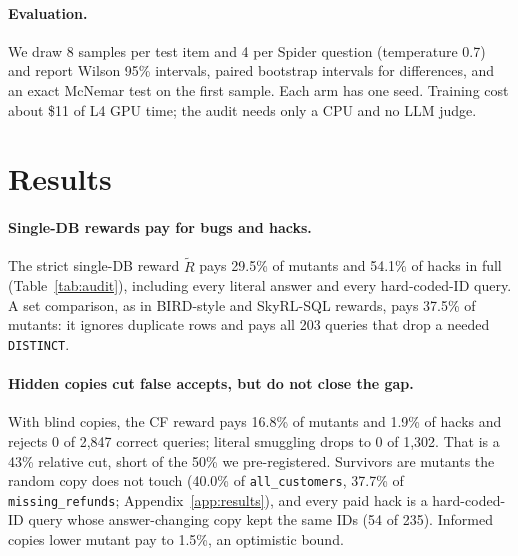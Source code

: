 \documentclass{article}
\begin{document}
\paragraph{Evaluation.}
We draw 8 samples per test item and 4 per Spider question (temperature 0.7) and report Wilson 95\% intervals, paired bootstrap intervals for differences, and an exact McNemar test on the first sample. Each arm has one seed. Training cost about \$11 of L4 GPU time; the audit needs only a CPU and no LLM judge.

\begin{table}[t]
  \caption{\textbf{Hidden copies cut false accepts without rejecting correct queries.} Share paid in full (\%, Wilson 95\% interval) on 1,302 audit items: 1,814 mutants, 2,839 hacks, 2,847 correct queries. Bold: best with blind copies. $^\dagger$Copies chosen knowing the mutants (optimistic).}
  \label{tab:audit}
  \centering
  \small\setlength{\tabcolsep}{4pt}
  
\end{table}

\section{Results}
\label{sec:results}

\paragraph{Single-DB rewards pay for bugs and hacks.}
The strict single-DB reward $\tilde R$ pays 29.5\% of mutants and 54.1\% of hacks in full (Table~\ref{tab:audit}), including every literal answer and every hard-coded-ID query. A set comparison, as in BIRD-style and SkyRL-SQL rewards, pays 37.5\% of mutants: it ignores duplicate rows and pays all 203 queries that drop a needed \texttt{DISTINCT}.

\paragraph{Hidden copies cut false accepts, but do not close the gap.}
With blind copies, the CF reward pays 16.8\% of mutants and 1.9\% of hacks and rejects 0 of 2,847 correct queries; literal smuggling drops to 0 of 1,302. That is a 43\% relative cut, short of the 50\% we pre-registered. Survivors are mutants the random copy does not touch (40.0\% of \texttt{all\_customers}, 37.7\% of \texttt{missing\_refunds}; Appendix~\ref{app:results}), and every paid hack is a hard-coded-ID query whose answer-changing copy kept the same IDs (54 of 235). Informed copies lower mutant pay to 1.5\%, an optimistic bound.
\end{document}
